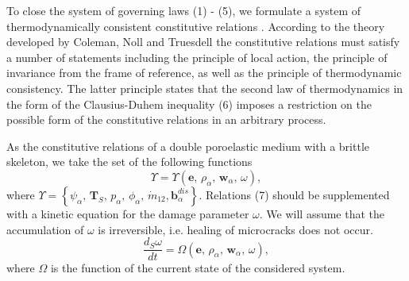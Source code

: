 \documentclass[article,authoryear,jpm]{beg_39}             %
\begin{document}
To close the system of governing laws (1) - (5), we formulate a system of thermodynamically consistent constitutive relations \cite{Truesdell}.
According to the theory developed by Coleman, Noll and Truesdell the constitutive relations must satisfy a number of statements including the principle of local action, the principle of invariance from the frame of reference, as well as the principle of thermodynamic consistency.
The latter principle states that the second law of thermodynamics in the form of the Clausius-Duhem inequality (6) imposes a restriction on the possible form of the constitutive relations in an arbitrary process.

As the constitutive relations of a double poroelastic medium with a brittle skeleton, we take the set of the following functions
\begin{equation}
\Upsilon =\Upsilon \left( \mathbf{e},\,{{\rho }_{\alpha }},\,{{\mathbf{w}}_{\alpha }},\,\omega \right),
\end{equation}
where $\Upsilon =\left\{ {{\psi }_{\alpha }},\,{{\mathbf{T}}_{S}},\,{{p}_{\alpha }},\,{{\phi }_{\alpha }},\,{{{\dot{m}}}_{12}},\mathbf{b}_{\alpha }^{dis} \right\}$. Relations (7) should be supplemented with a kinetic equation for the damage parameter $\omega$. We will assume that the accumulation of $\omega$ is irreversible, i.e. healing of microcracks does not occur.
\begin{equation}
\frac{{{d}_{S}}\omega }{dt}=\Omega \left( \mathbf{e},\,{{\rho }_{\alpha }},\,{{\mathbf{w}}_{\alpha }},\,\omega \right),
\end{equation}
where $\Omega$ is the function of the current state of the considered system.
\end{document}
